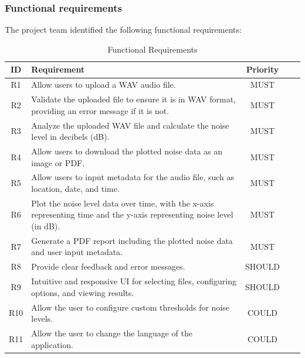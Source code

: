 \subsubsection{Functional requirements}\label{subsubsec:functional_requirements}
The project team identified the following functional requirements:
\begin{table}[H]
    \centering
    \begin{tabularx}{\textwidth}{c X c c c}
        \toprule
        \textbf{ID} & \textbf{Requirement}                                                                                                    & \textbf{Priority} \\
        \midrule
        R1          & Allow users to upload a WAV audio file.                                                                                 & MUST              \\
        \midrule
        R2          & Validate the uploaded file to ensure it is in WAV format, providing an error message if it is not.                      & MUST              \\
        \midrule
        R3          & Analyze the uploaded WAV file and calculate the noise level in decibels (dB).                                           & MUST              \\
        \midrule
        R4          & Allow users to download the plotted noise data as an image or PDF.                                                      & MUST              \\
        \midrule
        R5          & Allow users to input metadata for the audio file, such as location, date, and time.                                     & MUST              \\
        \midrule
        R6          & Plot the noise level data over time, with the x-axis representing time and the y-axis representing noise level (in dB). & MUST              \\
        \midrule
        R7          & Generate a PDF report including the plotted noise data and user input metadata.                                         & MUST              \\
        \midrule
        R8          & Provide clear feedback and error messages.                                                                              & SHOULD            \\
        \midrule
        R9          & Intuitive and responsive UI for selecting files, configuring options, and viewing results.                              & SHOULD            \\
        \midrule
        R10         & Allow the user to configure custom thresholds for noise levels.                                                         & COULD             \\
        \midrule
        R11         & Allow the user to change the language of the application.                                                               & COULD             \\
        \bottomrule
    \end{tabularx}
    \caption{Functional Requirements}\label{table:functional_requirements}
\end{table}

